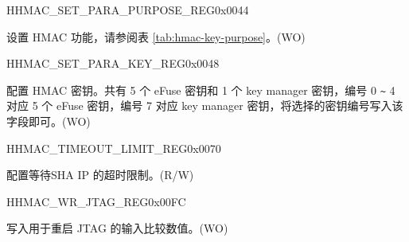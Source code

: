     \begin{register}{H}{HMAC\_SET\_PARA\_PURPOSE\_REG}{0x0044}\label{regdesc:HMACSETPARAPURPOSEREG}
    \regnewline%
    \begin{regdesc}\begin{reglist}
    \label{fielddesc:HMACPURPOSESET}\item [HMAC\_PURPOSE\_SET] 设置 HMAC 功能，请参阅表 \ref{tab:hmac-key-purpose}。(WO)
    \end{reglist}\end{regdesc}
    \end{register}


    \begin{register}{H}{HMAC\_SET\_PARA\_KEY\_REG}{0x0048}\label{regdesc:HMACSETPARAKEYREG}
    \regnewline%
    \begin{regdesc}\begin{reglist}
    \label{fielddesc:HMACKEYSET}\item [HMAC\_KEY\_SET] 配置 HMAC 密钥。共有 5 个 eFuse 密钥和 1 个 key manager 密钥，编号 0 \verb+~+ 4 对应 5 个 eFuse 密钥，编号 7 对应 key manager 密钥，将选择的密钥编号写入该字段即可。(WO)
    \end{reglist}\end{regdesc}
    \end{register}


\begin{register}{H}{HMAC\_TIMEOUT\_LIMIT\_REG}{0x0070}\label{regdesc:HMACTIMEOUTLIMITREG}
%
\regnewline%
\begin{regdesc}\begin{reglist}
\label{fielddesc:HMACTIMEOUTLIMIT}\item [HMAC\_TIMEOUT\_LIMIT] 配置等待SHA IP 的超时限制。(R/W)
\end{reglist}\end{regdesc}
\end{register}


    \begin{register}{H}{HMAC\_WR\_JTAG\_REG}{0x00FC}\label{regdesc:HMACWRJTAGREG}
    \regnewline%
    \begin{regdesc}\begin{reglist}
    \label{fielddesc:HMACWRJTAG}\item [HMAC\_WR\_JTAG] 写入用于重启 JTAG 的输入比较数值。(WO)
    \end{reglist}\end{regdesc}
    \end{register}


